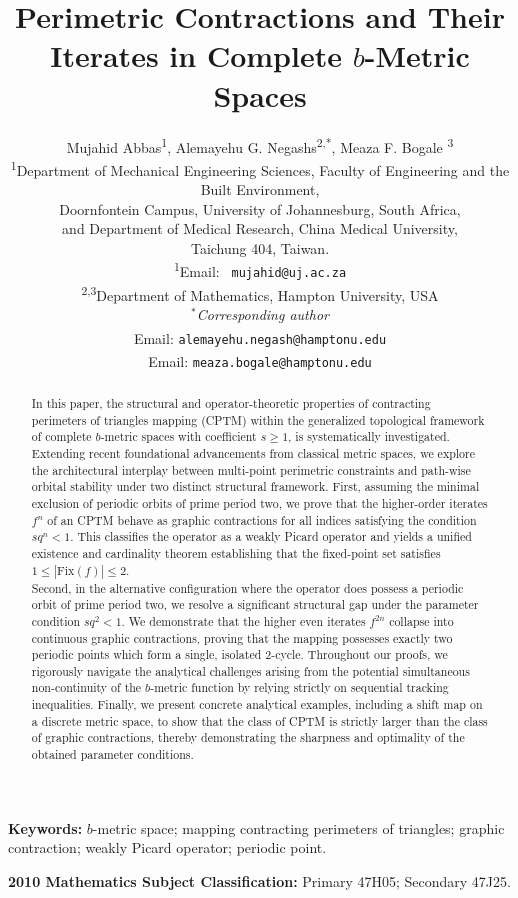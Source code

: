 \documentclass[a4paper,12pt,oneside]{article}
\title{Perimetric Contractions and Their Iterates in Complete $b$-Metric Spaces}
\author{
 Mujahid Abbas\textsuperscript{1},  Alemayehu G. Negashs\textsuperscript{2,*}, Meaza F. Bogale \textsuperscript{3}\\
\small \textsuperscript{1}Department of Mechanical Engineering Sciences, Faculty of Engineering and the Built Environment,\\ \small Doornfontein Campus, University of Johannesburg, South Africa, \\ \small and Department of Medical Research, China Medical University,\\ \small Taichung 404, Taiwan. \\
\small \textsuperscript{1}Email: \texttt{ mujahid@uj.ac.za} \\
\small \textsuperscript{2,3}Department of Mathematics, Hampton University, USA\\
$^*$\small  \textit{Corresponding author} \\
\small \textsuperscript{\dag}Email: \texttt{alemayehu.negash@hamptonu.edu}\\
\small \textsuperscript{\ddag}Email: \texttt{meaza.bogale@hamptonu.edu}
}
\date{}
\numberwithin{equation}{section}
\begin{document}
\maketitle

\begin{abstract}
In this paper, the structural and operator-theoretic properties of contracting perimeters of triangles mapping (CPTM) within the generalized topological framework of complete $b$-metric spaces with coefficient $s \geq 1$, is systematically investigated. Extending recent foundational advancements from classical metric spaces, we explore the architectural interplay between multi-point perimetric constraints and path-wise orbital stability under two distinct structural framework. First, assuming the minimal exclusion of periodic orbits of prime period two, we prove that the higher-order iterates $f^{n}$ of an CPTM behave as graphic contractions for all indices satisfying the condition $sq^{n} < 1$. This classifies the operator as a weakly Picard operator and yields a unified existence and cardinality theorem establishing that the fixed-point set satisfies $1 \leq |\mathrm{Fix}(f)| \leq 2$.\\ Second, in the alternative configuration where the operator does possess a periodic orbit of prime period two, we resolve a significant structural gap under the parameter condition $sq^{2} < 1$. We demonstrate that the higher even iterates $f^{2n}$ collapse into continuous graphic contractions, proving that the mapping possesses exactly two periodic points which form a single, isolated 2-cycle. Throughout our proofs, we rigorously navigate the analytical challenges arising from the potential simultaneous non-continuity of the $b$-metric function by relying strictly on sequential tracking inequalities. Finally, we present concrete analytical examples, including a shift map on a discrete metric space, to show that the class of CPTM is strictly larger than the class of graphic contractions, thereby demonstrating the sharpness and optimality of the obtained parameter conditions.
\end{abstract}
\textbf{Keywords:} $b$-metric space; mapping contracting perimeters of triangles; graphic contraction; weakly Picard operator; periodic point.

\textbf{2010 Mathematics Subject Classification:}  Primary 47H05; Secondary 47J25.
\maketitle
\end{document}
